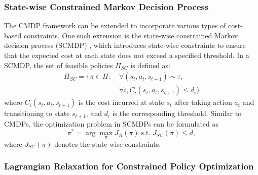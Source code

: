 \subsubsection{State-wise Constrained Markov Decision Process}

The CMDP framework can be extended to incorporate various types of cost-based constraints.
One such extension is the state-wise constrained Markov decision process (SCMDP) \cite{zhao2023state}, which introduces state-wise constraints to ensure that the expected cost at each state does not exceed a specified threshold.
In a SCMDP, the set of feasible policies $\Pi_{SC}$ is defined as:
\begin{equation} \label{eq:feasible_policy_set_scmdp}
    \begin{aligned}    
        \Pi_{SC} = \{ \pi \in \Pi: &\; \forall (s_t, a_t, s_{t + 1}) \sim \tau, \\
                                &\; \forall i, C_i(s_t, a_t, s_{t + 1}) \leq d_i \}
    \end{aligned}
\end{equation}
where $C_i(s_t, a_t, s_{t + 1})$ is the cost incurred at state $s_t$ after taking action $a_t$ and transitioning to state $s_{t + 1}$, and $d_i$ is the corresponding threshold.
Similar to CMDPs, the optimization problem in SCMDPs can be formulated as
\begin{equation} \label{eq:scmdp_optimization_problem}
    \pi^* = \arg\max_\pi J_R(\pi) \; \text{s.t.} \; J_{SC}(\pi) \leq d ,
\end{equation}
where $J_{SC}(\pi)$ denotes the state-wise constraints.  %

\subsubsection{Lagrangian Relaxation for Constrained Policy Optimization}

